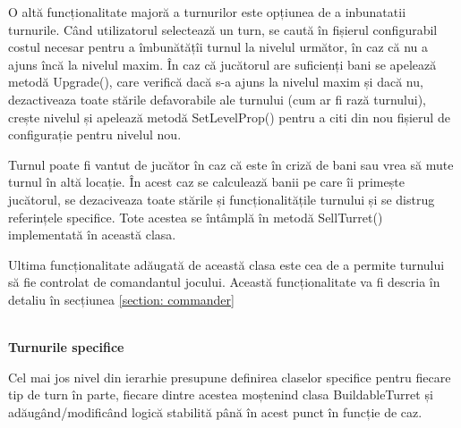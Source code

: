 \documentclass[12pt, a4paper]{article}
\begin{document}
	O altă funcționalitate majoră a turnurilor este opțiunea de a inbunatatii turnurile. Când utilizatorul selectează un turn, se caută în fișierul configurabil costul necesar pentru a îmbunătățîi turnul la nivelul următor, în caz că nu a ajuns încă la nivelul maxim. În caz că jucătorul are suficienți bani se apelează metodă Upgrade(), care verifică dacă s-a ajuns la nivelul maxim și dacă nu, dezactiveaza toate stările defavorabile ale turnului (cum ar fi rază turnului), crește nivelul și apelează metodă SetLevelProp() pentru a citi din nou fișierul de configurație pentru nivelul nou.
	\newline
	
	Turnul poate fi vantut de jucător în caz că este în criză de bani sau vrea să mute turnul în altă locație. În acest caz se calculează banii pe care îi primește jucătorul, se dezaciveaza toate stările și funcționalitățile turnului și se distrug referințele specifice. Tote acestea se întâmplă în metodă SellTurret() implementată în această clasa.
	\newline
	
	Ultima funcționalitate adăugată de această clasa este cea de a permite turnului să fie controlat de comandantul jocului. Această funcționalitate va fi descria în detaliu în secțiunea \ref{section: commander} 
	
	\ \\
	\textbf{Turnurile specifice}
	
	Cel mai jos nivel din ierarhie presupune definirea claselor specifice pentru fiecare tip de turn în parte, fiecare dintre acestea moștenind clasa BuildableTurret și adăugând/modificând logică stabilită până în acest punct în funcție de caz.
	
\end{document}
